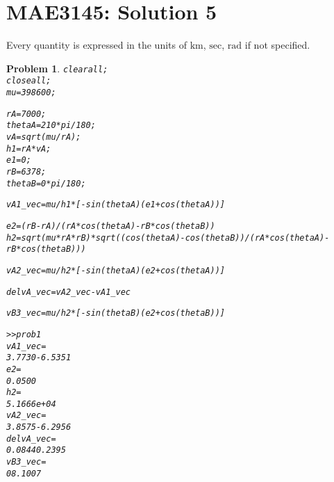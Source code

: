 \documentclass[10pt]{article}
\date{}
\renewcommand{\baselinestretch}{1.2}
\theoremstyle{plain}\theorembodyfont{\normalfont}
\newtheorem{prob}{Problem}[section]
\newenvironment{matlab}
{\begin{alltt}\small\renewcommand{\baselinestretch}{1.2}\selectfont}%
{\end{alltt}}
\begin{document}
\pagestyle{empty}
\section*{MAE3145: Solution 5}

Every quantity is expressed in the units of $\mathrm{km}$, $\mathrm{sec}$, $\mathrm{rad}$ if not specified.

\begin{prob}
\begin{matlab}
clear all;
close all;
mu=398600;

rA=7000;
thetaA=210*pi/180;
vA=sqrt(mu/rA);
h1=rA*vA;
e1=0;
rB=6378;
thetaB=0*pi/180;

vA1_vec=mu/h1*[-sin(thetaA) (e1+cos(thetaA))]

e2=(rB-rA)/(rA*cos(thetaA)-rB*cos(thetaB))
h2=sqrt(mu*rA*rB)*sqrt((cos(thetaA)-cos(thetaB))/(rA*cos(thetaA)-rB*cos(thetaB)))

vA2_vec=mu/h2*[-sin(thetaA) (e2+cos(thetaA))]

delvA_vec=vA2_vec-vA1_vec

vB3_vec=mu/h2*[-sin(thetaB) (e2+cos(thetaB))]

>> prob1
vA1_vec =
    3.7730   -6.5351
e2 =
    0.0500
h2 =
   5.1666e+04
vA2_vec =
    3.8575   -6.2956
delvA_vec =
    0.0844    0.2395
vB3_vec =
         0    8.1007
\end{matlab}


\end{prob}
\end{document}
